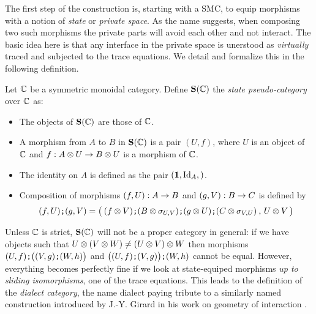 

The first step of the construction is, starting with a SMC, to equip morphisms with a notion of
\emph{state} or \emph{private space}. As the name suggests, when composing two such morphisms
the private parts will avoid each other and not interact. The basic idea here is that any interface
in the private space is unerstood as \emph{virtually} traced and subjected to the trace equations.
We detail and formalize this in the following definition.

\begin{definition}
	Let $\mathbb{C}$ be a symmetric monoidal category. Define $\mathbf S(\mathbb{C})$ the \emph{state 
	pseudo\footnotemark-category}
	over $\mathbb{C}$ as:
	\begin{itemize}
		\item The objects of $\mathbf S(\mathbb{C})$ are those of $\mathbb{C}$.
		\item A morphism from $A$ to $B$ in $\mathbf S(\mathbb{C})$ is a pair $(U,f)$,
		where $U$ is an object of $\mathbb{C}$ and $f:A\otimes U\rightarrow B\otimes U$ is a morphism of 
		$\mathbb{C}$.
		\item The identity on $A$ is defined as the pair $(\mathbf 1,\mbox{\normalfont Id}_A,)$.
		\item Composition of morphisms $(f,U):A\rightarrow B$ and $(g,V):B\rightarrow C$ is defined by
		$$(f,U)\textbf{\tt;}(g,V)=\big(\:
		( f\otimes V)\textbf{\tt;}(B\otimes \sigma_{U,V})\textbf{\tt;}(g\otimes U)\textbf{\tt;}(C\otimes\sigma_{V,U})
		\:,\,U\otimes V\,\big)$$
	\end{itemize}
\end{definition}

Unless $\mathbb{C}$ is strict, $\mathbf S(\mathbb{C})$ will not be a proper category in general: if we have objects
such that $U\otimes (V\otimes W)\neq (U\otimes V)\otimes W$ then morphisms
$(U,f) \textbf{\tt;} \big((V,g) \textbf{\tt;} (W,h)\big)$ and $\big((U,f) \textbf{\tt;} (V,g)\big) \textbf{\tt;} (W,h)$ cannot be equal.
However, everything becomes  perfectly fine if we look at state-equiped morphisms 
\emph{up to sliding isomorphisms}, one of the trace equations. This leads to the definition of the
\emph{dialect category}, the name dialect paying tribute to a similarly named construction introduced
by J.-Y. Girard in his work on geometry of interaction \cite{girard95}.

